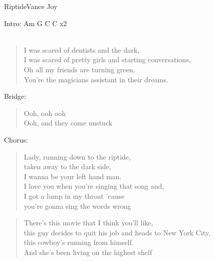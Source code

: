 \begin{song}{Riptide}{Vance Joy}
		
		Intro: Am G C C x2 \\ \\
		
		\begin{verse}
			I was scared of dentists and the \chord{C}dark,  \\
			I was scared of pretty girls and starting conversations, \\
			Oh all my friends are turning \chord{C}green,  \\
			You're the magicians assistant in their dreams.  
		\end{verse}
		
		Bridge: \\
		\begin{verse}
			Ooh, ooh ooh  \\
			Ooh, and they come unstuck 
		\end{verse}
		
		Chorus: \\
		\begin{verse}
			Lady, running down to the riptide, \\
			taken away to the dark side, \\
			I wanna be your left hand man. \\
			I love you when you're singing that song and, \\
			I got a lump in my throat 'cause \\
			you're gonna sing the words wr\chord{C}ong \\  
		\end{verse}
		
		\begin{verse}
			There's this movie that I think you'll like,  \\
			this guy decides to quit his job and heads to New York City, \\
			this cowboy's running from himse\chord{C}lf.  \\
			And she's been living on the highest shelf  
		\end{verse}
		

\end{song}
